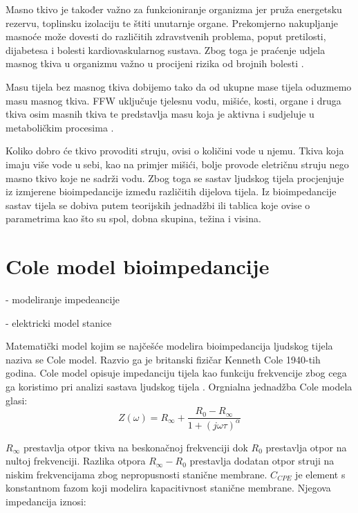 \documentclass[../diplomski_rad.tex]{subfiles}
\begin{document}
Masno tkivo je također važno za funkcioniranje organizma jer pruža energetsku rezervu, toplinsku izolaciju te štiti unutarnje organe. 
Prekomjerno nakupljanje masnoće može dovesti do različitih zdravstvenih problema, poput pretilosti, dijabetesa i 
bolesti kardiovaskularnog sustava. 
Zbog toga je praćenje udjela masnog tkiva u organizmu važno u procijeni rizika od brojnih bolesti \cite{Bera2014}.

Masu tijela bez masnog tkiva dobijemo tako da od ukupne mase tijela oduzmemo masu masnog tkiva. 
FFW uključuje tjelesnu vodu, mišiće, kosti, organe i druga tkiva osim masnih tkiva te predstavlja masu koja je aktivna i sudjeluje 
u metaboličkim procesima \cite{Bera2014}.

Koliko dobro će tkivo provoditi struju, ovisi o količini vode u njemu. 
Tkiva koja imaju više vode u sebi, kao na primjer mišići, bolje provode eletričnu struju nego masno tkivo koje ne sadrži vodu. 
Zbog toga se sastav ljudskog tijela procjenjuje iz izmjerene bioimpedancije između različitih dijelova tijela. 
Iz bioimpedancije sastav tijela se dobiva putem teorijskih jednadžbi ili tablica koje ovise o parametrima 
kao što su spol, dobna skupina, težina i visina.

\section{Cole model bioimpedancije}

- modeliranje impedeancije

- elektricki model stanice

Matematički model kojim se najčešće modelira bioimpedancija ljudskog tijela naziva se Cole model. 
Razvio ga je britanski fizičar Kenneth Cole 1940-tih godina. 
Cole model opisuje impedanciju tijela kao funkciju frekvencije zbog cega ga koristimo pri analizi sastava ljudskog tijela \cite{Freeborn2021}. 
Orgnialna jednadžba Cole modela glasi: 
\begin{equation}
    \label{jed:drugajednadzba}
    Z(\omega) = R_{\infty}+\frac{R_{0}-R_{\infty}}{1+(j\omega\tau)^{\alpha}} 
\end{equation} 

$R_{\infty}$ prestavlja otpor tkiva na beskonačnoj frekvenciji dok $R_{0}$ prestavlja otpor na nultoj frekvenciji. 
Razlika otpora $R_{\infty}-R_{0}$ prestavlja dodatan otpor struji na niskim frekvencijama zbog nepropusnosti stanične membrane. 
$C_{CPE}$ je element s konstantnom fazom koji modelira kapacitivnost stanične membrane. Njegova impedancija iznosi: 
\end{document}
